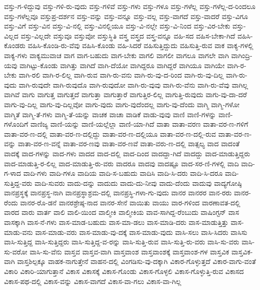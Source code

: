 {ವಸ್ತು-ಗ-ಳಿದ್ದುವು
ವಸ್ತು-ಗಳಿ-ರು-ವುದು
ವಸ್ತು-ಗಳಿವೆ
ವಸ್ತು-ಗಳು
ವಸ್ತು-ಗಳೂ
ವಸ್ತು-ಗಳೆಲ್ಲ
ವಸ್ತು-ಗಳೆಲ್ಲ-ದ-ರಿಂದಲೂ
ವಸ್ತು-ಗಳೆಲ್ಲವೂ
ವಸ್ತುಪ್ರ-ದರ್ಶನ
ವಸ್ತು-ವನ್ನು
ವಸ್ತು-ವನ್ನೂ
ವಸ್ತು-ವಲ್ಲ
ವಸ್ತು-ವಾಗದೆ
ವಸ್ತು-ವಾದರೆ
ವಸ್ತು-ವಿಗೂ
ವಸ್ತು-ವಿಗೆ
ವಸ್ತು-ವಿನ
ವಸ್ತು-ವಿ-ನಲ್ಲಿ
ವಸ್ತು-ವಿನಲ್ಲಿಯೂ
ವಸ್ತು-ವಿ-ನಲ್ಲೇ
ವಸ್ತು-ವಿ-ನಿಂದ
ವಸ್ತು-ವಿರ-ಬೇಕು
ವಸ್ತು-ವಿಲ್ಲದ
ವಸ್ತು-ವಿಲ್ಲದೇ
ವಸ್ತುವೂ
ವಸ್ತುವೋ
ವಸ್ತುಸ್ಥಿತಿ
ವಸ್ತ್ರ
ವಸ್ತ್ರದ
ವಸ್ತ್ರ-ವನ್ನೂ
ವಹಿ-ಸದ
ವಹಿಸ-ಬೇಕಾ-ಗಿದೆ
ವಹಿಸಿ-ಕೊಂಡರು
ವಹಿಸಿ-ಕೊಂಡಿ-ರು-ವೆವು
ವಹಿಸಿ-ಕೊಂಡು
ವಹಿ-ಸಿದರೆ
ವಹಿಸುತ್ತಿದ್ದುದು
ವಹಿಸುತ್ತಿ-ರುವ
ವಾಕ
ವಾಕ್ಯ-ಗಳಲ್ಲಿ
ವಾಕ್ಯ-ಗಳು
ವಾಕ್ಯಮುವಾಚ
ವಾಗ
ವಾಗ-ಬಹುದು
ವಾಗ-ಬೇಕು
ವಾಗಲಿ
ವಾಗಲೀ
ವಾಗಲೂ
ವಾಗಲೇ
ವಾಗಿ
ವಾಗಿಂದ್ರಿ-ಯವು
ವಾಗಿಟ್ಟು-ಕೊಂಡು
ವಾಗಿತ್ತು
ವಾಗಿದೆ
ವಾಗಿ-ದೆಯೋ
ವಾಗಿದ್ದರೂ
ವಾಗಿದ್ದರೆ
ವಾಗಿಯೂ
ವಾಗಿಯೇ
ವಾಗಿ-ರ-ಬೇಕು
ವಾಗಿ-ರಲಿ
ವಾಗಿ-ರ-ಲಿಲ್ಲ
ವಾಗಿ-ರುವ
ವಾಗಿ-ರು-ವನು
ವಾಗಿ-ರು-ವು-ದ-ರಿಂದ
ವಾಗಿ-ರು-ವು-ದಿಲ್ಲ
ವಾಗಿ-ರು-ವುದು
ವಾಗಿ-ರುವುದೇ
ವಾಗಿ-ರುವುದೊ
ವಾಗಿ-ರುವುದೋ
ವಾಗಿ-ರು-ವುವು
ವಾಗಿ-ರು-ವೆನು
ವಾಗಿ-ರು-ವೆವು
ವಾಗಿಲ್ಲ
ವಾಗಿವೆ
ವಾಗು
ವಾಗುತ್ತ
ವಾಗುತ್ತದೆ
ವಾಗುತ್ತಾ
ವಾಗುತ್ತಾರೆ
ವಾಗುತ್ತಿರ-ಲಿಲ್ಲ
ವಾಗುತ್ತಿ-ರುವುದು
ವಾಗು-ವು-ದಾ-ದರೆ
ವಾಗು-ವು-ದಿಲ್ಲ
ವಾಗು-ವು-ದಿಲ್ಲವೋ
ವಾಗು-ವುದು
ವಾಗು-ವುದೆಂದಲ್ಲ
ವಾಗು-ವು-ದೆಂದು
ವಾಗ್ಮಿ
ವಾಗ್ಮಿ-ಗಳೋ
ವಾಗ್ಮಿತೆ
ವಾಗ್ಮಿ-ತೆ-ಗಳು
ವಾಗ್ಮಿ-ತೆ-ಯನ್ನು
ವಾಚಕ
ವಾಚಾ
ವಾಡಿಕೆ
ವಾಡು-ವುವು
ವಾಣಿ
ವಾಣಿ-ಗಳನ್ನು
ವಾಣಿ-ಗಳೊಂದಿಗೆ
ವಾಣಿಜ್ಯ
ವಾಣಿ-ಯನ್ನು
ವಾಣಿ-ಯಲ್ಲೆಲ್ಲಾ
ವಾಣಿ-ಯಾ-ಗಿದೆ
ವಾತಾ
ವಾತಾ-ವರಣ
ವಾತಾ-ವರ-ಣ-ಗಳಿಗೆ
ವಾತಾ-ವರ-ಣ-ದಲ್ಲಿ
ವಾತಾ-ವರ-ಣ-ದಲ್ಲಿದ್ದು
ವಾತಾ-ವರ-ಣ-ದಲ್ಲಿಯೂ
ವಾತಾ-ವರ-ಣ-ದಲ್ಲಿ-ರುವ
ವಾತಾ-ವರ-ಣ-ವನ್ನು
ವಾತಾ-ವರ-ಣ-ವನ್ನೆ
ವಾತಾ-ವರ-ಣವು
ವಾತಾ-ವರ-ಣವೆ
ವಾತಾ-ವರು-ಣ-ದಲ್ಲಿ
ವಾತ್ಸಲ್ಯ
ವಾದ
ವಾದಂತೆ
ವಾದಕ್ಕೆ
ವಾದ-ಗಳನ್ನು
ವಾದ-ಗಳು
ವಾದದ
ವಾದ-ದಲ್ಲಿ
ವಾದ-ದಿಂದ
ವಾದದ್ದಾ-ಗಿದೆ
ವಾದದ್ದು
ವಾದ-ಮಾಡುತ್ತಿದ್ದರು
ವಾದ-ಮಾಡುತ್ತಿ-ರ-ಲಿಲ್ಲ
ವಾದ-ಮಾಡುತ್ತಿ-ರು-ವರು
ವಾದರೂ
ವಾದವು
ವಾದಷ್ಟೂ
ವಾದ-ಸರ-ಣಿ-ಗಳಲ್ಲಿ
ವಾದಿ
ವಾದಿ-ಗ-ಳಾದ
ವಾದಿ-ಗಳು
ವಾದಿ-ಗಳೂ
ವಾದಿಯ
ವಾದಿ-ಸ-ಬಹುದು
ವಾದಿಸಿ
ವಾದಿ-ಸಿ-ದರು
ವಾದಿ-ಸಿ-ದರೂ
ವಾದಿ-ಸುತ್ತಿದ್ದ-ವರು
ವಾದಿ-ಸುವರು
ವಾದು-ದನ್ನು
ವಾದುದು
ವಾದು-ದು-ನೀವು
ವಾದು-ದೆಂದು
ವಾದುವು
ವಾದ್ಯಗೋಷ್ಠಿ
ವಾನಪ್ರಸ್ಥಕ್ಕೆ
ವಾನಪ್ರಸ್ಥ-ನಾಗಿ
ವಾನಪ್ರಸ್ಥಾಶ್ರಮ-ದಲ್ಲಿ
ವಾನಪ್ರಸ್ಥಿ-ಗಳಾ-ಗು-ವುದು
ವಾನರ
ವಾನರರ
ವಾನ-ರರು
ವಾನರ-ರೆಂದು
ವಾನರ-ರೊ-ಡನೆ
ವಾನರಶ್ರೇಷ್ಠ-ನಾದ
ವಾನರ-ಸೇನೆ
ವಾಯಿತು
ವಾಯು
ವಾರ-ಗಳಿಂದ
ವಾರಣಾವತ-ದಲ್ಲಿ
ವಾರದ
ವಾರು
ವಾರ್ತ
ವಾಲಿ
ವಾಲಿ-ಯಿಂದ
ವಾಲ್ಮೀಕಿ
ವಾಲ್ಮೀಕಿಯ
ವಾವ-ಸಾಗಿದ್ದ-ರೆಂಬುದು
ವಾಷಿಂಗ್ಟನ್
ವಾಸ
ವಾಸಕ್ಕಾಗಿ
ವಾಸ-ನೆ-ಗಳು
ವಾಸ-ಮಾಡ-ಬಹುದು
ವಾಸ-ಮಾ-ಡಲು
ವಾಸ-ಮಾಡಿ-ದರು
ವಾಸ-ಮಾಡುತ್ತಿತ್ತು
ವಾಸ-ಮಾಡು-ವನು
ವಾಸ-ಮಾಡು-ವರು
ವಾಸ-ಮಾಡು-ವು-ದಕ್ಕೆ
ವಾಸ-ಮಾಡು-ವುದು
ವಾಸಿ-ಸಲು
ವಾಸಿ-ಸಿದರು
ವಾಸಿಸು
ವಾಸಿ-ಸುತ್ತಿದ್ದ
ವಾಸಿ-ಸುತ್ತಿದ್ದರು
ವಾಸಿ-ಸುತ್ತಿದ್ದ-ವ-ರನ್ನು
ವಾಸಿ-ಸುತ್ತಿ-ರುವ
ವಾಸಿ-ಸುತ್ತಿ-ರು-ವರು
ವಾಸಿ-ಸು-ವರು
ವಾಸಿ-ಸು-ವರೋ
ವಾಸಿ-ಸು-ವೆನು
ವಾಸ್ತವ
ವಾಸ್ತವ-ವಾಗಿ
ವಾಸ್ತವಾಂಶ
ವಾಸ್ತವಾಂಶಕ್ಕೆ
ವಾಸ್ತವಾಂಶ-ಗಳ
ವಾಸ್ತವಿಕ
ವಾಸ್ತವಿಕ-ವಾಗಿ
ವಾಸ್ತಶಿಲ್ಪಕ್ಕೂ
ವಾಹಕ-ನಾಗುತ್ತೇನೆ
ವಾಹನ-ದಲ್ಲಿ
ವಿಂಗಡಿಸು-ವು-ದಕ್ಕಾಗಿ
ವಿಕಾರ-ಗೊಳ್ಳುತ್ತದೆ
ವಿಕಾರ-ವಾಗು-ವಂತೆ
ವಿಕಾರಿ
ವಿಕಾರಿ-ಯಾಗುತ್ತಾನೆ
ವಿಕಾಸ
ವಿಕಾಸಕ್ಕೆ
ವಿಕಾಸ-ಗೊಂಡು
ವಿಕಾಸ-ಗೊಳ್ಳಲಿ
ವಿಕಾಸ-ಗೊಳ್ಳುತ್ತಿ-ರುವ
ವಿಕಾಸದ
ವಿಕಾಸ-ಪಥ-ದಲ್ಲಿ
ವಿಕಾಸ-ವನ್ನು
ವಿಕಾಸ-ವಾಗದೆ
ವಿಕಾಸ-ವಾ-ಗಲು
ವಿಕಾಸ-ವಾ-ಗಿಲ್ಲ
}
